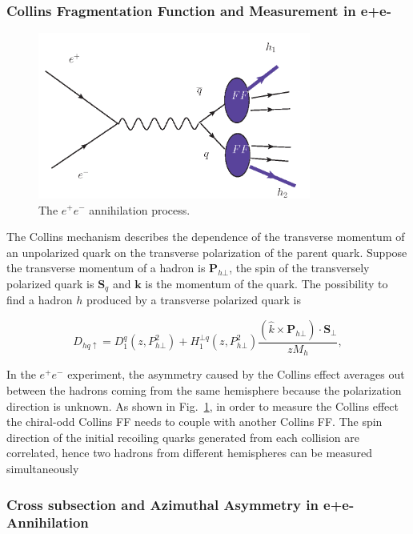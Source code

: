 \subsubsection{Collins Fragmentation Function and Measurement in e+e-}
 \begin{figure}[h]
    \centering
    \includegraphics[width=0.8\textwidth,natwidth=610,natheight=642]{figure_theory/e+e-.png}
    \caption[Short caption]{The $e^+e^-$ annihilation process.}
    \label{fig:e+e-}
\end{figure}
The Collins mechanism describes the dependence of the transverse momentum of an unpolarized quark on the transverse polarization of the parent quark. Suppose the transverse momentum of a hadron is $\boldsymbol{P}_{h\bot}$, the spin of the transversely polarized quark is $\boldsymbol{S}_q$ and $\boldsymbol{k}$ is the momentum of the quark. The possibility to find a hadron $h$ produced by a transverse polarized quark is\cite{ChargedPionResult,SSATrentoConvention}

\begin{equation}
D_{hq\uparrow}=D^q_1(z,P^2_{h\bot})+H^{\bot q}_1(z,P^2_{h\bot})\frac{(\hat{k}\times \boldsymbol{P}_{h\bot})\cdot \boldsymbol{S}_{\perp}}{zM_h},
\label{eqn:FF1}
\end{equation}


In the $e^+e^-$ experiment, the asymmetry caused by the Collins effect averages out between the hadrons coming from the same hemisphere because the polarization direction is unknown. As shown in Fig.~\ref{fig:e+e-}, in order to measure the Collins effect the chiral-odd Collins FF needs to couple with another Collins FF. The spin direction of the initial recoiling quarks generated from each collision are correlated, hence two hadrons from different hemispheres can be measured simultaneously~\cite{BoerThesis,ChargedPionResult2}

\subsubsection{Cross subsection and Azimuthal Asymmetry in e+e- Annihilation}

